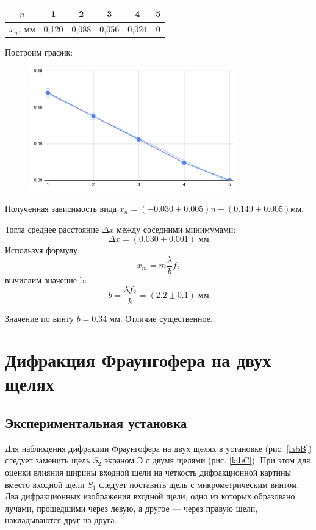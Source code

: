 \documentclass[a4paper,12pt]{article} %
\begin{document}
\begin{table}[H]
  \centering
  \begin{tabular}{|c|c|c|c|c|c|}
    \hline
   \(n\)           &  1    & 2     &  3    &  4    &  5    \\\hline
   \(x_n,\;мм\)    & 0,120 & 0,088 & 0,056 & 0,024 & 0 \\\hline
  \end{tabular}
\end{table}


Построим график:
\begin{figure}[H]
  \centering
  \includegraphics[width=0.8\textwidth]{fgfr.png}
\end{figure}

Полученная зависимость вида \(x_n = (-0.030 \pm 0.005)n + (0.149 \pm 0.005) мм\).

Тогла среднее расстояние \(\Delta x\) между соседними минимумами:
\[ \Delta x = (0.030 \pm 0.001)\; мм \]
Используя формулу:
\[ x_m = m \frac{\lambda}{b}f_2 \]
вычислим значение b:
\[ b = \frac{\lambda f_2}{k} = (2.2 \pm 0.1)\;мм\]

Значение по винту \(b = 0.34\;мм\). Отличие существенное.

\section{Дифракция Фраунгофера на двух щелях}

\subsection{Экспериментальная установка}

Для наблюдения дифракции Фраунгофера на двух щелях в установке (рис. \ref{labB}) следует заменить щель $ S_2 $ экраном Э с двумя щелями
(рис. \ref{labC}). При этом для оценки влияния ширины входной щели на чёткость дифракционной картины вместо входной щели $ S_1 $ следует поставить щель с микрометрическим винтом. Два дифракционных изображения входной щели, одно из которых образовано лучами, прошедшими через левую, а другое --- через правую щели, накладываются друг на друга.
\end{document}
